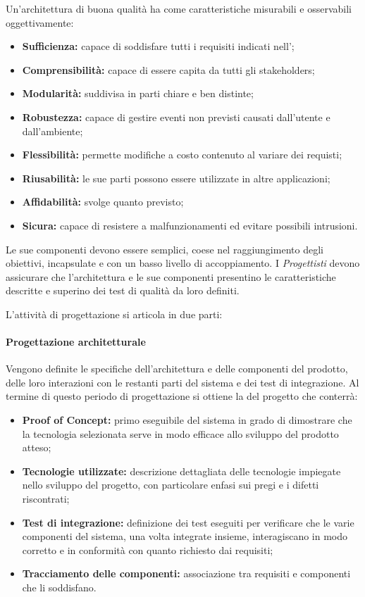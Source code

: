 \label{QualitàProgettazione}Un'architettura di buona qualità ha come caratteristiche misurabili e osservabili oggettivamente:
\begin{itemize}
	\item \textbf{Sufficienza:} capace di soddisfare tutti i requisiti indicati nell'\AdR; 
	\item \textbf{Comprensibilità:} capace di essere capita da tutti gli stakeholders;
	\item \textbf{Modularità:} suddivisa in parti chiare e ben distinte;
	\item \textbf{Robustezza:} capace di gestire eventi non previsti causati dall'utente e dall'ambiente;
	\item \textbf{Flessibilità:} permette modifiche a costo contenuto al variare dei requisti;
	\item \textbf{Riusabilità:} le sue parti possono essere utilizzate in altre applicazioni;
	\item \textbf{Affidabilità:} svolge quanto previsto;
	\item \textbf{Sicura:} capace di resistere a malfunzionamenti ed evitare possibili intrusioni.
\end{itemize}
Le sue componenti devono essere semplici, coese nel raggiungimento degli obiettivi, incapsulate e con un basso livello di accoppiamento.
I \textit{Progettisti} devono assicurare che l'architettura e le sue componenti presentino le caratteristiche descritte e superino dei test di qualità da loro definiti.

\newpage
{}\label{PeriodiProgettazione}L'attività di progettazione si articola in due parti: 
\paragraph*{Progettazione architetturale} 
Vengono definite le specifiche dell'architettura e delle componenti del prodotto, delle loro interazioni con le restanti parti del sistema e dei test di integrazione. Al termine di questo periodo di progettazione si ottiene la  del progetto che conterrà: 
\begin{itemize}
	\item \textbf{Proof of Concept:} primo eseguibile del sistema in grado di dimostrare che la tecnologia selezionata serve in modo efficace allo sviluppo del prodotto atteso;
	\item \textbf{Tecnologie utilizzate:} descrizione dettagliata delle tecnologie impiegate nello sviluppo del progetto, con particolare enfasi sui pregi e i difetti riscontrati;
	\item \textbf{Test di integrazione:} definizione dei test eseguiti per verificare che le varie componenti del sistema, una volta integrate insieme, interagiscano in modo corretto e in conformità con quanto richiesto dai requisiti;
	\item \textbf{Tracciamento delle componenti:} associazione tra requisiti e componenti che li soddisfano.
\end{itemize}


